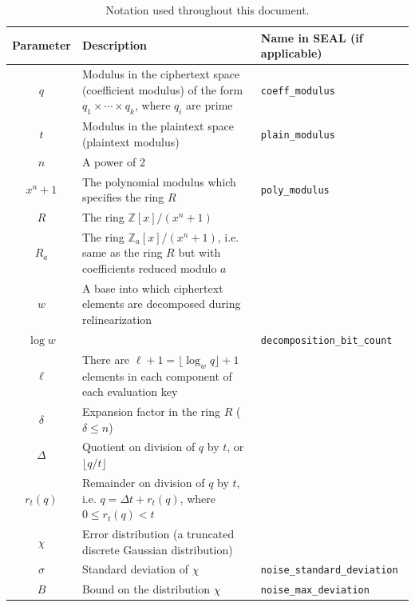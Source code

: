 \begin{table}[ht]
\centering
\renewcommand{\arraystretch}{1.3}
\begin{tabular}{|c|p{8.2cm}|p{3.5cm}|}
\hline
\textbf{Parameter} & \textbf{Description} &
\textbf{Name in SEAL (if applicable)} \\
\hline

$q$ &
Modulus in the ciphertext space (coefficient modulus) of the
form $q_1 \times \cdots \times q_k$, where $q_i$ are prime
&
\texttt{coeff\_modulus}
\\
\hline

$t$ &
Modulus in the plaintext space (plaintext modulus)
&
\texttt{plain\_modulus}
\\
\hline

$n$ &
A power of 2
&
\\
\hline

$x^n+1$ &
The polynomial modulus which specifies the ring $R$
&
\texttt{poly\_modulus}
\\
\hline

$R$ &
The ring $\mathbb{Z}[x]/(x^n+1)$
&
\\
\hline

$R_a$ &
The ring $\mathbb{Z}_a[x]/(x^n+1)$, i.e. same as the ring $R$
but with coefficients reduced modulo $a$
&
\\
\hline

$w$ &
A base into which ciphertext elements are decomposed during
relinearization
&
\\
\hline

$\log w$ &
&
\texttt{decomposition\_bit\_count}
\\
\hline

$\ell$ &
There are $\ell+1=\lfloor\log_w q\rfloor+1$ elements in each
component of each evaluation key
&
\\
\hline

$\delta$ &
Expansion factor in the ring $R$ ($\delta \leq n$)
&
\\
\hline

$\Delta$ &
Quotient on division of $q$ by $t$, or $\lfloor q/t\rfloor$
&
\\
\hline

$r_t(q)$ &
Remainder on division of $q$ by $t$, i.e.
$q=\Delta t+r_t(q)$, where $0\leq r_t(q)<t$
&
\\
\hline

$\chi$ &
Error distribution (a truncated discrete Gaussian distribution)
&
\\
\hline

$\sigma$ &
Standard deviation of $\chi$
&
\texttt{noise\_standard\_deviation}
\\
\hline

$B$ &
Bound on the distribution $\chi$
&
\texttt{noise\_max\_deviation}
\\
\hline

\end{tabular}
\caption{Notation used throughout this document.}
\label{tab:notation}
\end{table}